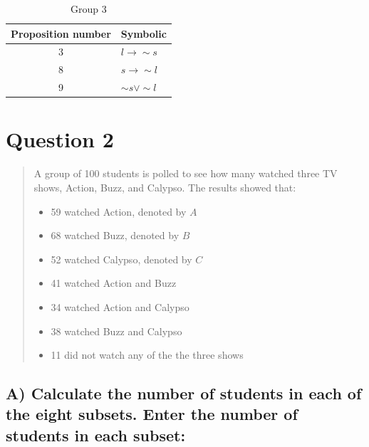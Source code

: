 \documentclass[12pt,a4paper]{article}
\begin{document}
\begin{table}[h]
\centering
\caption{Group 3}
\begin{tabular}{c|l}
Proposition number & Symbolic \\
\hline
3 & $l \rightarrow \sim{s}$ \\
\hline
8 & $s \rightarrow \sim{l}$ \\
\hline
9 & $\sim{s} \vee \sim{l}$ \\
\hline
\end{tabular}
\end{table}

\newpage
\section{Question 2}
\begin{quote}
A group of 100 students is polled to see how many watched three TV shows, Action, Buzz, and Calypso. The results showed that:
\begin{itemize}
\item 59 watched Action, denoted by $A$
\item 68 watched Buzz, denoted by $B$
\item 52 watched Calypso, denoted by $C$
\item 41 watched Action and Buzz
\item 34 watched Action and Calypso
\item 38 watched Buzz and Calypso
\item 11 did not watch any of the the three shows 
\end{itemize}
\end{quote}

\subsection{A) Calculate the number of students in each of the eight subsets. Enter the number of students in each subset:}
\end{document}
